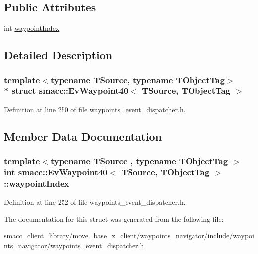 \subsection*{Public Attributes}
\begin{DoxyCompactItemize}
\item 
int \hyperlink{structsmacc_1_1EvWaypoint40_a587fce400efce68271da9d1b172c33d9}{waypoint\+Index}
\end{DoxyCompactItemize}


\subsection{Detailed Description}
\subsubsection*{template$<$typename T\+Source, typename T\+Object\+Tag$>$\\*
struct smacc\+::\+Ev\+Waypoint40$<$ T\+Source, T\+Object\+Tag $>$}



Definition at line 250 of file waypoints\+\_\+event\+\_\+dispatcher.\+h.



\subsection{Member Data Documentation}
\subsubsection[{\texorpdfstring{waypoint\+Index}{waypointIndex}}]{\setlength{\rightskip}{0pt plus 5cm}template$<$typename T\+Source , typename T\+Object\+Tag $>$ int {\bf smacc\+::\+Ev\+Waypoint40}$<$ T\+Source, T\+Object\+Tag $>$\+::waypoint\+Index}\hypertarget{structsmacc_1_1EvWaypoint40_a587fce400efce68271da9d1b172c33d9}{}\label{structsmacc_1_1EvWaypoint40_a587fce400efce68271da9d1b172c33d9}


Definition at line 252 of file waypoints\+\_\+event\+\_\+dispatcher.\+h.



The documentation for this struct was generated from the following file\+:\begin{DoxyCompactItemize}
\item 
smacc\+\_\+client\+\_\+library/move\+\_\+base\+\_\+z\+\_\+client/waypoints\+\_\+navigator/include/waypoints\+\_\+navigator/\hyperlink{waypoints__event__dispatcher_8h}{waypoints\+\_\+event\+\_\+dispatcher.\+h}\end{DoxyCompactItemize}
